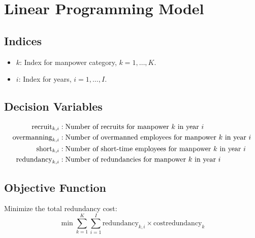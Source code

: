 \documentclass{article}
\begin{document}
\section*{Linear Programming Model}

\subsection*{Indices}
\begin{itemize}
    \item \( k \): Index for manpower category, \( k = 1, \ldots, K \).
    \item \( i \): Index for years, \( i = 1, \ldots, I \).
\end{itemize}

\subsection*{Decision Variables}
\begin{align*}
    \text{recruit}_{k,i} & : \text{Number of recruits for manpower \( k \) in year \( i \)} \\
    \text{overmanning}_{k,i} & : \text{Number of overmanned employees for manpower \( k \) in year \( i \)} \\
    \text{short}_{k,i} & : \text{Number of short-time employees for manpower \( k \) in year \( i \)} \\
    \text{redundancy}_{k,i} & : \text{Number of redundancies for manpower \( k \) in year \( i \)}
\end{align*}

\subsection*{Objective Function}
Minimize the total redundancy cost:
\[
\min \sum_{k=1}^{K} \sum_{i=1}^{I} \text{redundancy}_{k,i} \times \text{costredundancy}_{k}
\]
\end{document}
